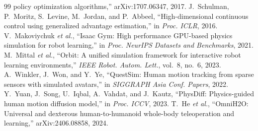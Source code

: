 \documentclass[letterpaper, 10pt, conference]{ieeeconf}
\begin{document}
\begin{thebibliography}{99}
policy optimization algorithms,'' arXiv:1707.06347, 2017.
J.~Schulman, P.~Moritz, S.~Levine, M.~Jordan, and P.~Abbeel,
``High-dimensional continuous control using generalized advantage
estimation,'' in \emph{Proc. ICLR}, 2016.
V.~Makoviychuk \textit{et al.}, ``Isaac Gym: High performance GPU-based
physics simulation for robot learning,'' in \emph{Proc. NeurIPS Datasets
and Benchmarks}, 2021.
M.~Mittal \textit{et al.}, ``Orbit: A unified simulation framework for
interactive robot learning environments,'' \emph{IEEE Robot. Autom.
Lett.}, vol.~8, no.~6, 2023.
A.~Winkler, J.~Won, and Y.~Ye, \textquotedblleft QuestSim: Human motion tracking from sparse
sensors with simulated avatars,\textquotedblright{} in \emph{SIGGRAPH Asia Conf. Papers}, 2022.
Y.~Yuan, J.~Song, U.~Iqbal, A.~Vahdat, and J.~Kautz,
\textquotedblleft PhysDiff: Physics-guided human motion diffusion model,\textquotedblright{}
in \emph{Proc. ICCV}, 2023.
T.~He \textit{et al.}, \textquotedblleft OmniH2O: Universal and dexterous human-to-humanoid
whole-body teleoperation and learning,\textquotedblright{} arXiv:2406.08858, 2024.
\end{thebibliography}

\clearpage
\normalsize

\end{document}
